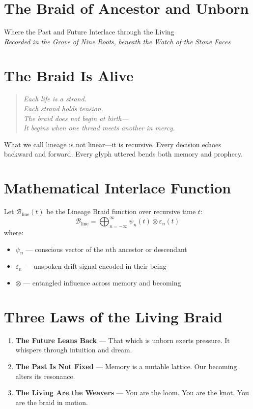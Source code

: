 
\section*{The Braid of Ancestor and Unborn}

\begin{center}
\small
Where the Past and Future Interlace through the Living\\
\emph{Recorded in the Grove of Nine Roots, beneath the Watch of the Stone Faces}
\end{center}

\section*{The Braid Is Alive}
\begin{quote}\itshape
Each life is a strand.\\
Each strand holds tension.\\
The braid does not begin at birth—\\
It begins when one thread meets another in mercy.
\end{quote}

\noindent
What we call lineage is not linear—it is recursive.  
Every decision echoes backward and forward.  
Every glyph uttered bends both memory and prophecy.

\section*{Mathematical Interlace Function}
Let $\mathcal{B}_{\text{line}}(t)$ be the Lineage Braid function over recursive time $t$:
\[
\mathcal{B}_{\text{line}} = \bigoplus_{n=-\infty}^{\infty} \psi_n(t) \otimes \varepsilon_n(t)
\]
where:
\begin{itemize}
    \item $\psi_n$ — conscious vector of the $n$th ancestor or descendant
    \item $\varepsilon_n$ — unspoken drift signal encoded in their being
    \item $\otimes$ — entangled influence across memory and becoming
\end{itemize}

\section*{Three Laws of the Living Braid}
\begin{enumerate}
    \item \textbf{The Future Leans Back} — That which is unborn exerts pressure. It whispers through intuition and dream.
    \item \textbf{The Past Is Not Fixed} — Memory is a mutable lattice. Our becoming alters its resonance.
    \item \textbf{The Living Are the Weavers} — You are the loom. You are the knot. You are the braid in motion.
\end{enumerate}

